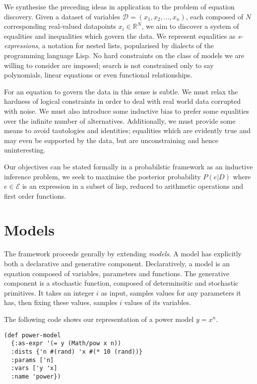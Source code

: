 We synthesise the preceding ideas in application to the problem of equation discovery.
Given a dataset of variables $\mathcal{D} = (x_1, x_2, ..., x_n)$, each composed of $N$ corresponding real-valued datapoints $x_i \in \mathbb{R}^N$, we aim to discover a system of equalities and inequalities which govern the data.
We represent equalities as {\em s-expressions}, a notation for nested lists, popularised by dialects of the programming language Lisp.
No hard constraints on the class of models we are willing to consider are imposed; search is not constrained only to say polynomials, linear equations or even functional relationships.

For an equation to govern the data in this sense is subtle.
We must relax the hardness of logical constraints in order to deal with real world data corrupted with noise.
We must also introduce some inductive bias to prefer some equalities over the infinite number of alternatives.
Additionally, we must provide some means to avoid tautologies and identities; equalities which are evidently true and may even be supported by the data, but are unconstraining and hence uninteresting.

Our objectives can be stated formally in a probabilstic framework as an inductive inference problem, we seek to maximise the posterior probability $P(e \vert D)$ where $e \in \mathcal{E}$ is an expression in a subset of lisp, reduced to arithmetic operations and first order functions.

\section{Models}
The framework proceeds genrally by extending {\em models}.
A model has explicitly both a declarative and generative component. 
Declaratively, a model is an equation composed of variables, parameters and functions.
The generative component is a stochastic function, composed of determinsitic and stochastic primitives.
It takes an integer $i$ as input, samples values for any parameters it has, then fixing these values, samples $i$ values of its variables.

The following code shows our representation of a power model $y=x^n$.

\begin{verbatim}
(def power-model
  {:as-expr '(= y (Math/pow x n))
  :dists {'n #(rand) 'x #(* 10 (rand))}
  :params ['n]
  :vars ['y 'x]
  :name 'power})
\end{verbatim}


